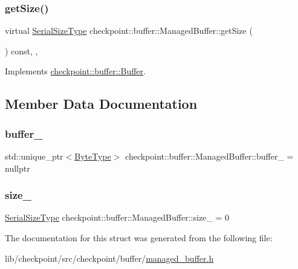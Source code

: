 \subsubsection{\texorpdfstring{get\+Size()}{getSize()}}
{\footnotesize\ttfamily virtual \hyperlink{namespacecheckpoint_a083f6674da3f94c2901b18c6d238217c}{Serial\+Size\+Type} checkpoint\+::buffer\+::\+Managed\+Buffer\+::get\+Size (\begin{DoxyParamCaption}{ }\end{DoxyParamCaption}) const\hspace{0.3cm}{\ttfamily [inline]}, {\ttfamily [override]}, {\ttfamily [virtual]}}



Implements \hyperlink{structcheckpoint_1_1buffer_1_1_buffer_a4d78cd3d4ab338bab7911fac4fe9434d}{checkpoint\+::buffer\+::\+Buffer}.



\subsection{Member Data Documentation}
\mbox{\label{structcheckpoint_1_1buffer_1_1_managed_buffer_a7918a4749b6ab59e0f53ec761ee0b2e2}} 
\subsubsection{\texorpdfstring{buffer\+\_\+}{buffer\_}}
{\footnotesize\ttfamily std\+::unique\+\_\+ptr$<$\hyperlink{structcheckpoint_1_1buffer_1_1_managed_buffer_a89ff3aa4c92cd2c65973751ff4328dd5}{Byte\+Type}$>$ checkpoint\+::buffer\+::\+Managed\+Buffer\+::buffer\+\_\+ = nullptr\hspace{0.3cm}{\ttfamily [private]}}

\mbox{\label{structcheckpoint_1_1buffer_1_1_managed_buffer_a91bd6942b3e8f48c9edbcc6e1b148982}} 
\subsubsection{\texorpdfstring{size\+\_\+}{size\_}}
{\footnotesize\ttfamily \hyperlink{namespacecheckpoint_a083f6674da3f94c2901b18c6d238217c}{Serial\+Size\+Type} checkpoint\+::buffer\+::\+Managed\+Buffer\+::size\+\_\+ = 0\hspace{0.3cm}{\ttfamily [private]}}



The documentation for this struct was generated from the following file\+:\begin{DoxyCompactItemize}
\item 
lib/checkpoint/src/checkpoint/buffer/\hyperlink{managed__buffer_8h}{managed\+\_\+buffer.\+h}\end{DoxyCompactItemize}
